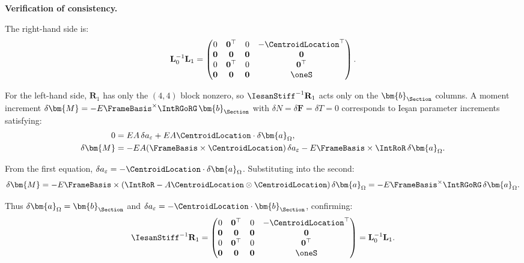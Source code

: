 \begin{Details}

\textbf{Verification of consistency.}

The right-hand side is:
\begin{equation}
\mathbf{L}_0^{-1}\mathbf{L}_1 = \begin{pmatrix}
0 & \mathbf{0}^\top & 0 & -\CentroidLocation^\top \\
\mathbf{0} & \mathbf{0} & \mathbf{0} & \mathbf{0} \\
0 & \mathbf{0}^\top & 0 & \mathbf{0}^\top \\
\mathbf{0} & \mathbf{0} & \mathbf{0} & \oneS
\end{pmatrix}.
\end{equation}

For the left-hand side, $\mathbf{R}_1$ has only the $(4,4)$ block nonzero, 
so $\IesanStiff^{-1}\mathbf{R}_1$ acts only on the $\bm{b}_{\Section}$ columns. 
A moment increment $\delta\bm{M} = -E\FrameBasis^\times\IntRGoRG\,\bm{b}_{\Section}$ 
with $\delta N = \delta\bm{F} = \delta T = 0$ corresponds to Ieşan parameter 
increments satisfying:
\begin{align*}
0 &= EA\,\delta a_\varepsilon + EA\CentroidLocation\cdot \delta\bm{a}_\Omega, \\
\delta\bm{M} &= -EA(\FrameBasis \times \CentroidLocation)\,\delta a_\varepsilon 
- E\FrameBasis\times\IntRoR\,\delta\bm{a}_\Omega.
\end{align*}

From the first equation, $\delta a_\varepsilon = -\CentroidLocation\cdot \delta\bm{a}_\Omega$. 
Substituting into the second:
\begin{equation*}
\delta\bm{M} = -E\FrameBasis\times(\IntRoR - A\CentroidLocation \otimes \CentroidLocation)\,\delta\bm{a}_\Omega 
= -E\FrameBasis^\times\IntRGoRG\,\delta\bm{a}_\Omega.
\end{equation*}

Thus $\delta\bm{a}_\Omega = \bm{b}_{\Section}$ and 
$\delta a_\varepsilon = -\CentroidLocation\cdot \bm{b}_{\Section}$, confirming:
\begin{equation*}
\IesanStiff^{-1}\mathbf{R}_1 = \begin{pmatrix}
0 & \mathbf{0}^\top & 0 & -\CentroidLocation^\top \\
\mathbf{0} & \mathbf{0} & \mathbf{0} & \mathbf{0} \\
0 & \mathbf{0}^\top & 0 & \mathbf{0}^\top \\
\mathbf{0} & \mathbf{0} & \mathbf{0} & \oneS
\end{pmatrix} = \mathbf{L}_0^{-1}\mathbf{L}_1.
\end{equation*}
\end{Details}

